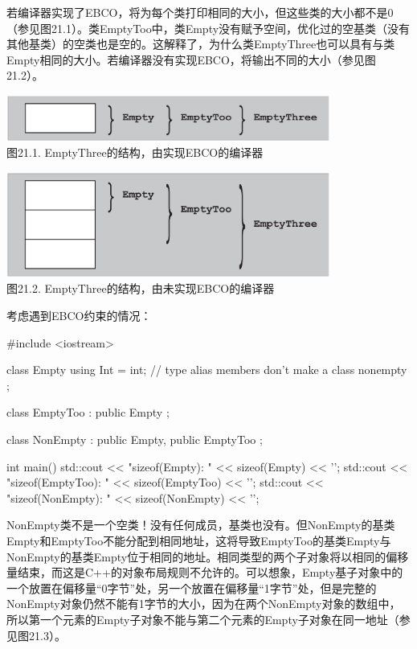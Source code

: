 若编译器实现了EBCO，将为每个类打印相同的大小，但这些类的大小都不是0（参见图21.1）。类EmptyToo中，类Empty没有赋予空间，优化过的空基类（没有其他基类）的空类也是空的。这解释了，为什么类EmptyThree也可以具有与类Empty相同的大小。若编译器没有实现EBCO，将输出不同的大小（参见图21.2）。

\begin{center}
\includegraphics[width=0.8\textwidth]{part3/ch21/images/1.png} \\
图21.1. EmptyThree的结构，由实现EBCO的编译器
\end{center}

\begin{center}
\includegraphics[width=0.8\textwidth]{part3/ch21/images/2.png} \\
图21.2. EmptyThree的结构，由未实现EBCO的编译器
\end{center}

考虑遇到EBCO约束的情况：

\begin{cpp}
#include <iostream>

class Empty {
	using Int = int; // type alias members don't make a class nonempty
};

class EmptyToo : public Empty {};

class NonEmpty : public Empty, public EmptyToo {};

int main() {
	std::cout << "sizeof(Empty): " << sizeof(Empty) << '\n';
	std::cout << "sizeof(EmptyToo): " << sizeof(EmptyToo) << '\n';
	std::cout << "sizeof(NonEmpty): " << sizeof(NonEmpty) << '\n';
}
\end{cpp}

NonEmpty类不是一个空类！没有任何成员，基类也没有。但NonEmpty的基类Empty和EmptyToo不能分配到相同地址，这将导致EmptyToo的基类Empty与NonEmpty的基类Empty位于相同的地址。相同类型的两个子对象将以相同的偏移量结束，而这是C++的对象布局规则不允许的。可以想象，Empty基子对象中的一个放置在偏移量“0字节”处，另一个放置在偏移量“1字节”处，但是完整的NonEmpty对象仍然不能有1字节的大小，因为在两个NonEmpty对象的数组中，所以第一个元素的Empty子对象不能与第二个元素的Empty子对象在同一地址（参见图21.3）。

